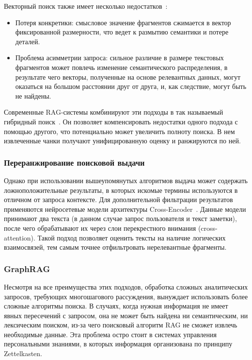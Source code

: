 Векторный поиск также имеет несколько недостатков~\cite{Gao_2023}:
\begin{itemize}
      \item Потеря конкретики: смысловое значение фрагментов
            сжимается в вектор фиксированной размерности,
            что ведет к размытию семантики и потере деталей.
      \item Проблема асимметрии запроса:
            сильное различие в размере текстовых фрагментов может повлечь
            изменение семантического распределения,
            в результате чего векторы, полученные на основе релевантных данных,
            могут оказаться на большом расстоянии друг от друга,
            и, как следствие, могут быть не найдены.
\end{itemize}

Современные RAG-системы комбинируют эти подходы в
так называемый гибридный поиск~\cite{Gao_2023}. Он позволяет
компенсировать недостатки одного подхода с помощью другого,
что потенциально может увеличить полноту поиска.
В нем извлеченные чанки получают унифицированную оценку
и ранжируются по ней.

\subsubsection*{Переранжирование поисковой выдачи}

Однако при использовании вышеупомянутых
алгоритмов выдача может содержать ложноположительные результаты,
в которых искомые термины используются в отличном от запроса контексте.
Для дополнительной фильтрации результатов
применяются нейросетевые модели архитектуры Cross-Encoder~\cite{Nogueira_2019}.
Данные модели принимают два текста (в данном случае запрос пользователя и текст заметки),
после чего обрабатывают их через слои перекрестного внимания (cross-attention).
Такой подход позволяет оценить тексты на наличие логических взаимосвязей,
тем самым точнее отфильтровать нерелевантные фрагменты.

\subsubsection*{GraphRAG}

Несмотря на все преимущества этих подходов,
обработка сложных аналитических запросов,
требующих многошагового рассуждения,
вынуждает использовать более сложные алгоритмы поиска.
В случаях, когда нужная информация не имеет явных пересечений с запросом,
она не может быть найдена
ни семантическим, ни лексическим поиском, из-за чего
поисковый алгоритм RAG не сможет извлечь необходимые данные.
Эта проблема остро стоит в
системах управления персональными знаниями,
в которых информация организована по принципу Zettelkasten.

